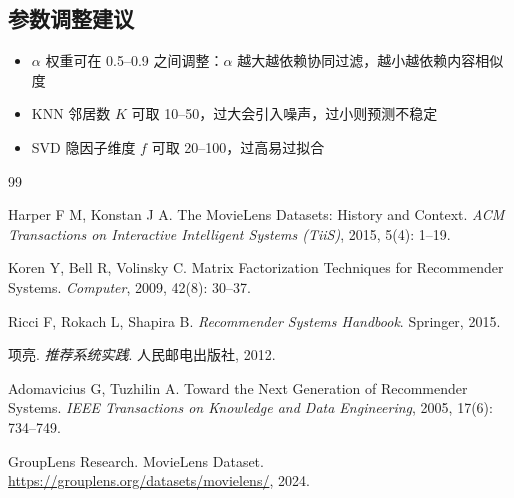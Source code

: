 \documentclass[12pt,a4paper]{ctexart}
\begin{document}
\subsection{参数调整建议}

\begin{itemize}[leftmargin=*]
    \item $\alpha$ 权重可在 0.5--0.9 之间调整：$\alpha$ 越大越依赖协同过滤，越小越依赖内容相似度
    \item KNN 邻居数 $K$ 可取 10--50，过大会引入噪声，过小则预测不稳定
    \item SVD 隐因子维度 $f$ 可取 20--100，过高易过拟合
\end{itemize}

\begin{thebibliography}{99}

Harper F M, Konstan J A.
The MovieLens Datasets: History and Context\allowbreak[J].
\textit{ACM Transactions on Interactive Intelligent Systems (TiiS)},
2015, 5(4): 1--19.

Koren Y, Bell R, Volinsky C.
Matrix Factorization Techniques for Recommender Systems\allowbreak[J].
\textit{Computer}, 2009, 42(8): 30--37.

Ricci F, Rokach L, Shapira B.
\textit{Recommender Systems Handbook}\allowbreak[M].
Springer, 2015.

项亮.
\textit{推荐系统实践}\allowbreak[M].
人民邮电出版社, 2012.

Adomavicius G, Tuzhilin A.
Toward the Next Generation of Recommender Systems\allowbreak[J].
\textit{IEEE Transactions on Knowledge and Data Engineering},
2005, 17(6): 734--749.

GroupLens Research.
MovieLens Dataset\allowbreak[EB/OL].
\url{https://grouplens.org/datasets/movielens/}, 2024.

\end{thebibliography}
\end{document}
